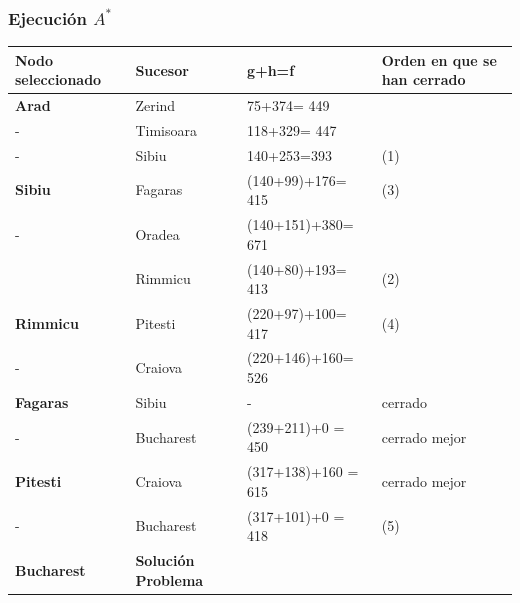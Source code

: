 \documentclass[xcolor=table]{beamer}
\begin{document}
\begin{frame}  \frametitle{Ejecución $A^*$ }\footnotesize  

\begin{table}[]
\begin{tabular}{|l|l|l|l|}
\hline
\rowcolor[HTML]{C0C0C0} 
\textbf{Nodo seleccionado}  & \textbf{Sucesor}           & \textbf{g+h=f}               & \textbf{Orden en que se han cerrado} \\ \hline
\textbf{Arad}      & Zerind            & 75+374= 449         &                             \\ \hline
-                  & Timisoara         & 118+329= 447        &                             \\ \hline
-                  & Sibiu             & 140+253=393         & (1)                         \\ \hline\hline

\textbf{Sibiu}     & Fagaras           & (140+99)+176= 415   & (3)                         \\ \hline
-                  & Oradea            & (140+151)+380= 671  &                             \\ \hline
                   & Rimmicu           & (140+80)+193= 413   & (2)                         \\ \hline\hline

\textbf{Rimmicu}   & Pitesti           & (220+97)+100= 417   & (4)                         \\ \hline
-                  & Craiova           & (220+146)+160= 526  &                             \\ \hline\hline

\textbf{Fagaras}   & Sibiu             & -                   & cerrado                     \\ \hline
-                  & Bucharest         & (239+211)+0 = 450   & cerrado mejor               \\ \hline\hline

\textbf{Pitesti}   & Craiova           & (317+138)+160 = 615 & cerrado mejor               \\ \hline
-                  & Bucharest         & (317+101)+0 = 418   & (5)                         \\ \hline
\textbf{Bucharest} & \textbf{Solución Problema} &                     &                             \\ \hline
\end{tabular}
\end{table}

\end{frame} 
\end{document}
